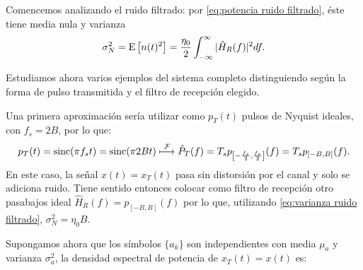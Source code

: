 Comencemos analizando el ruido filtrado: por \eqref{eq:potencia ruido filtrado}, éste tiene media nula y
varianza
\begin{equation}\label{eq:varianza ruido filtrado}
\sigma_N^2=\mathrm{E}\left[n(t)^2\right]=\frac{\eta_0}{2}\int_{-\infty}^{\infty}|\hat{H}_R(f)|^2 df.    
\end{equation}

Estudiamos ahora varios ejemplos del sistema completo distinguiendo según la forma de pulso transmitida y el filtro de recepción elegido.

\begin{ejemplo}

    Una primera aproximación sería utilizar como $p_T(t)$ pulsos de Nyquist ideales, con $f_s=2B$, por lo que:
    \begin{equation*}
        p_T(t) = \operatorname{sinc}(\pi f_s t) = \operatorname{sinc}(\pi 2B t) \;\displaystyle{\mathop{\longmapsto}^{\mathcal{F}}}\; \hat{P}_T(f) = T_s p_{\left[-\frac{f_s}{2},\frac{f_s}{2}\right]}(f) = T_s p_{[-B,B]}(f).
    \end{equation*}
    En este caso, la señal $x(t)=x_T(t)$ pasa sin distorsión por el canal y solo se adiciona ruido. Tiene sentido entonces colocar como filtro de recepción otro pasabajos ideal $\hat{H}_R(f) = p_{[-B,B]}(f)$ por lo que, utilizando \eqref{eq:varianza ruido filtrado}, $\sigma_N^2 = \eta_0 B$.

    Supongamos ahora que los símbolos $\{a_k\}$ son independientes con media $\mu_a$ y varianza $\sigma_a^2$, la densidad espectral de potencia de $x_T(t)=x(t)$ es:

    \begin{center}
    \end{center}


\end{ejemplo}
